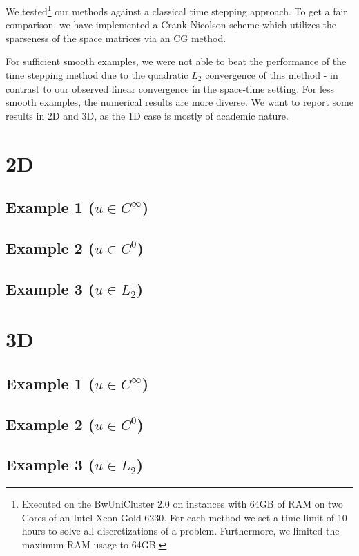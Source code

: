 \documentclass{article}
\begin{document}
We tested\footnote{Executed on the BwUniCluster 2.0 on instances with 64GB of RAM on two Cores of an Intel Xeon Gold 6230. For each method we set a time limit of 10 hours to solve all discretizations of a problem. Furthermore, we limited the maximum RAM usage to 64GB. } our methods against a classical time stepping approach. To get a fair comparison, we have implemented a Crank-Nicolson scheme which utilizes the sparseness of the space matrices via an CG method. 

For sufficient smooth examples, we were not able to beat the performance of the time stepping method due to the quadratic $L_2$ convergence of this method - in contrast to our observed linear convergence in the space-time setting. For less smooth examples, the numerical results are more diverse. We want to report some results in 2D and 3D, as the 1D case is mostly of academic nature.

\scriptsize
\section*{2D}
\subsection*{Example 1 ($u \in C^\infty$)}


\subsection*{Example 2 ($u \in C^0$)}


\subsection*{Example 3 ($u \in L_2$)}


\newpage
\section*{3D}
\subsection*{Example 1 ($u \in C^\infty$)}


\subsection*{Example 2 ($u \in C^0$)}


\subsection*{Example 3 ($u \in L_2$)}

\end{document}

